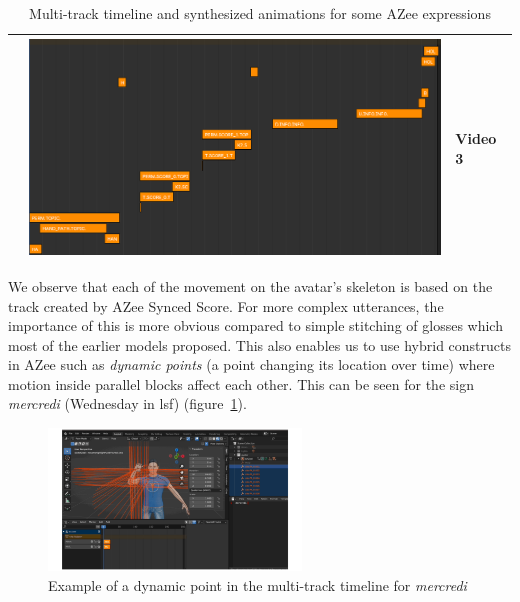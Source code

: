 \documentclass[../../main.tex]{subfiles}
\begin{document}
\begin{table}[H]
\begin{tabular}{|c|p{4.5cm}|p{2cm}|}
{        } & \includegraphics[width=\linewidth]{chapters/multi_track/images/result_ch4_persone_age_52_timeline.png} & Video 3~\tablefootnote{\url{https://github.com/Paritosh97/phd/raw/master/supplementary_material/ch4person52.mp4}} \\
        \hline
    \end{tabular}
    \caption{Multi-track timeline and synthesized animations for some AZee expressions}
    \label{tab:azee_to_blender}
\end{table}

We observe that each of the movement on the avatar's skeleton is based on the track created by AZee Synced Score. For more complex utterances, the importance of this is more obvious compared to simple stitching of glosses which most of the earlier models proposed. This also enables us to use hybrid constructs in AZee such as \emph{dynamic points} (a point changing its location over time) where motion inside parallel blocks affect each other. This can be seen for the sign \emph{mercredi} (Wednesday in \gls{lsf}) (figure~\ref{fig:dynpoint_example}).

\begin{figure}[h]
    \centering
    \includegraphics[width=0.6\textwidth]{chapters/multi_track/images/dynpoint_example.png}
    \caption{Example of a dynamic point in the multi-track timeline for \emph{mercredi}}
    \label{fig:dynpoint_example}
\end{figure}
\end{document}
